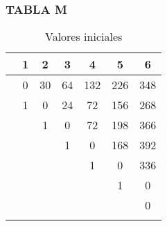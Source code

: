 \documentclass[10]{beamer}
\begin{document}
\begin{frame}\frametitle{TABLA M}
 \color{white}
\begin{table}
 \begin{tabular}{ c | c  | c  | c  | c  | c  | c }
 \\    & 1   & 2   & 3   & 4   & 5   & 6  \\ 
 \hline \hline 
 & 0& 30& 64& 132& 226& 348\\ 
 \hline \hline 
 & 1& 0& 24& 72& 156& 268\\ 
 \hline \hline 
  & & 1& 0& 72& 198& 366\\ 
 \hline \hline 
  &  & & 1& 0& 168& 392\\ 
 \hline \hline 
  &  &  & & 1& 0& 336\\ 
 \hline \hline 
  &  &  &  & & 1& 0\\ 
 \hline \hline 
  &  &  &  &  & & 0\\ 
 \hline \hline 
  \\ 
  
 \end{tabular}
 \color{white}
\caption{Valores iniciales}
 \end{table}
 \end{frame} 
\end{document}
